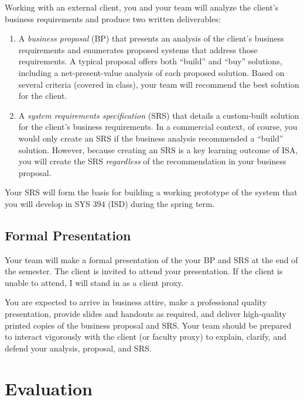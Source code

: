 \documentclass[11pt]{article}
\begin{document}
Working with an external client,
you and your team
will analyze the client's business requirements
and produce two written deliverables:
\begin{enumerate}
\item A \emph{business proposal} (BP) that presents an analysis
  of the client's business requirements
  and enumerates proposed systems
  that address those requirements.
  A typical proposal
  offers both ``build'' and ``buy'' solutions,
  including a net-present-value analysis of each proposed solution.
  Based on several criteria (covered in class),
  your team will recommend the best solution for the client.
\item A \emph{system requirements specification} (SRS)
  that details a custom-built solution for the client's business requirements.
  In a commercial context, of course,
  you would only create an SRS
  if the business analysis recommended a ``build'' solution.
  However, because creating an SRS is a key learning outcome of ISA,
  you will create the SRS \emph{regardless} of the recommendation in your business proposal.
\end{enumerate}
Your SRS will form the basis for building a working prototype of the system
that you will develop in SYS 394 (ISD) during the spring term.

\subsection{Formal Presentation}

Your team will make a formal presentation of the your BP and SRS at the end
of the semester. The client is invited to attend your presentation. If the client is
unable to attend, I will stand in as a client proxy.

You are expected to arrive in business attire, make a professional quality presentation,
provide slides and handouts as required, and deliver high-quality printed copies of the
business proposal and SRS. Your team should be prepared to interact vigorously with the
client (or faculty proxy) to explain, clarify, and defend your analysis, proposal, and
SRS.

\newpage
\section{Evaluation}
\label{sec:orgheadline10}
\end{document}
